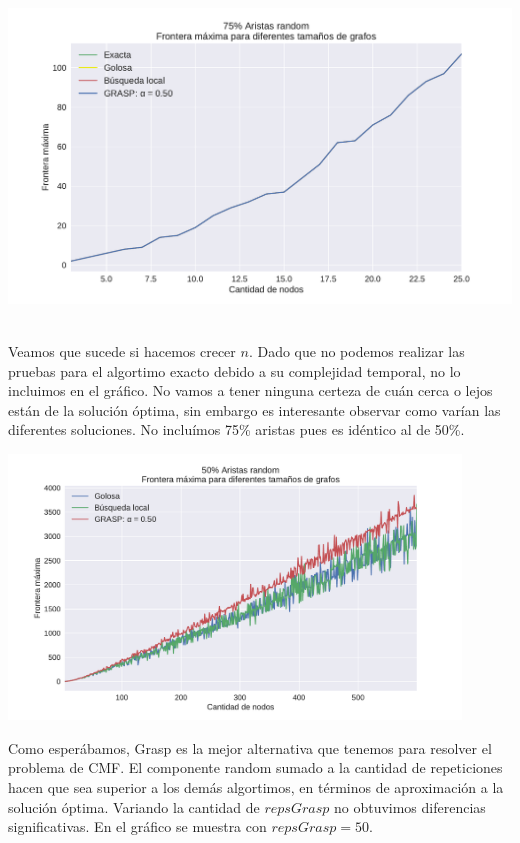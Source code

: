 {\centering
    \includegraphics[width=1\textwidth]{informe/imgs/exp_random75_frontera_todos_v2.pdf}
}
$ $ \newline

Veamos que sucede si hacemos crecer $n$. Dado que no podemos realizar las pruebas para el algortimo exacto debido a su complejidad temporal, no lo incluimos en el gráfico. No vamos a tener ninguna certeza de cuán cerca o lejos están de la solución óptima, sin embargo es interesante observar como varían las diferentes soluciones. No incluímos 75\% aristas pues es idéntico al de 50\%.

{\centering
    \includegraphics[width=0.9\textwidth]{informe/imgs/exp_random50_frontera_todos_ngrande.pdf}
}

Como esperábamos, Grasp es la mejor alternativa que tenemos para resolver el problema de CMF. El componente random sumado a la cantidad de repeticiones hacen que sea superior a los demás algortimos, en términos de aproximación a la solución óptima. Variando la cantidad de $repsGrasp$ no obtuvimos diferencias significativas. En el gráfico se muestra con $repsGrasp = 50$. \\

